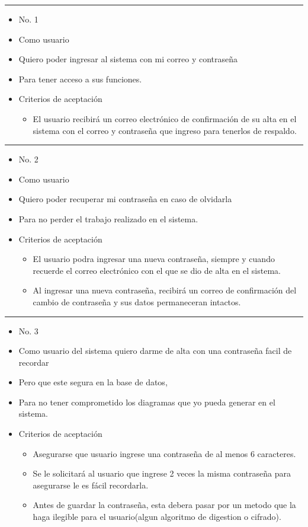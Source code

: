\noindent\rule{\textwidth}{1pt}
\begin{itemize}
	\item No. 1
	\item Como usuario
	\item Quiero poder ingresar al sistema con mi correo y contraseña
	\item Para tener acceso a sus funciones.
	\item Criterios de aceptación
	\begin{itemize}
		\item El usuario recibirá un correo electrónico de confirmación de su alta en el sistema con el correo y contraseña que ingreso para tenerlos de respaldo.
	\end{itemize}
\end{itemize}
\noindent\rule{\textwidth}{1pt}
\begin{itemize}
	\item No. 2
	\item Como usuario
	\item Quiero poder recuperar mi contraseña en caso de olvidarla
	\item Para no perder el trabajo realizado en el sistema.
	\item Criterios de aceptación
	\begin{itemize}
		\item El usuario podra ingresar una nueva contraseña, siempre y cuando recuerde el correo electrónico con el que se dio de alta en el sistema.
		\item Al ingresar una nueva contraseña, recibirá un correo de confirmación del cambio de contraseña y sus datos permaneceran intactos.
	\end{itemize}
\end{itemize}
\noindent\rule{\textwidth}{1pt}
\begin{itemize}
	\item No. 3
	\item Como usuario del sistema quiero darme de alta con una contraseña facil de recordar
	\item Pero que este segura en la base de datos,
	\item Para no tener comprometido los diagramas que yo pueda generar en el sistema.

	\item Criterios de aceptación
	\begin{itemize}
		\item Asegurarse que usuario ingrese una contraseña de al menos 6 caracteres.
		\item Se le solicitará al usuario que ingrese 2 veces la misma contraseña para asegurarse le es fácil recordarla.
		\item Antes de guardar la contraseña, esta debera pasar por un metodo que la haga ilegible para el usuario(algun algoritmo de digestion o cifrado).
	\end{itemize}
\end{itemize}
